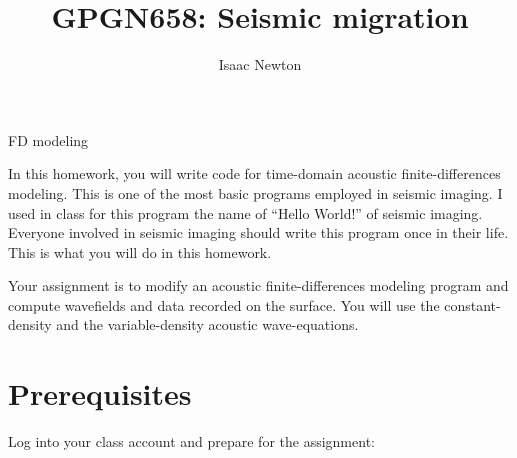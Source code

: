 \author{Isaac Newton}
\title{GPGN658: Seismic migration}{FD modeling}

In this homework, you will write code for time-domain acoustic
finite-differences modeling. This is one of the most basic programs
employed in seismic imaging. I used in class for this program the name
of ``Hello World!'' of seismic imaging. Everyone involved in seismic
imaging should write this program once in their life. This is what you
will do in this homework.

Your assignment is to modify an acoustic finite-differences modeling
program and compute wavefields and data recorded on the surface. You
will use the constant-density and the variable-density acoustic
wave-equations.


\section{Prerequisites}

Log into your class account and prepare for the assignment:

